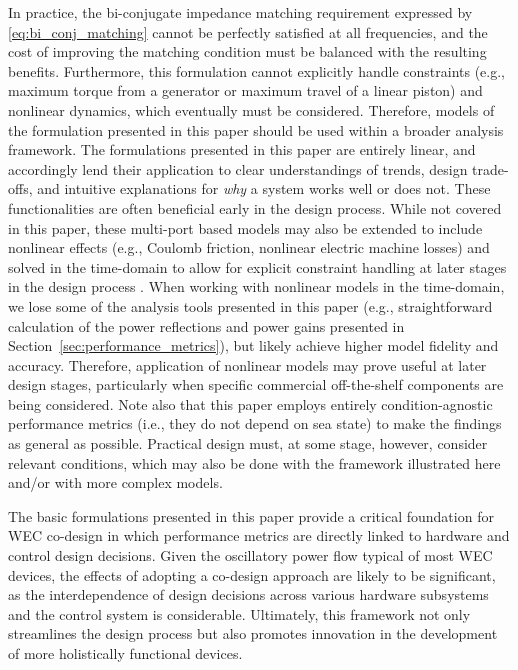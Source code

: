 \documentclass[5p,times]{elsarticle}
\begin{document}
In practice, the bi-conjugate impedance matching requirement expressed by \eqref{eq:bi_conj_matching} cannot be perfectly satisfied at all frequencies, and the cost of improving the matching condition must be balanced with the resulting benefits.
Furthermore, this formulation cannot explicitly handle constraints (e.g., maximum torque from a generator or maximum travel of a linear piston) and nonlinear dynamics, which eventually must be considered.
Therefore, models of the formulation presented in this paper should be used within a broader analysis framework.
The formulations presented in this paper are entirely linear, and accordingly lend their application to clear understandings of trends, design trade-offs, and intuitive explanations for \emph{why} a system works well or does not.
These functionalities are often beneficial early in the design process.
While not covered in this paper, these multi-port based models may also be extended to include nonlinear effects (e.g., Coulomb friction, nonlinear electric machine losses) and solved in the time-domain to allow for explicit constraint handling at later stages in the design process \cite{Gaebele:2023wf}.
When working with nonlinear models in the time-domain, we lose some of the analysis tools presented in this paper (e.g., straightforward calculation of the power reflections and power gains presented in Section~\ref{sec:performance_metrics}), but likely achieve higher model fidelity and accuracy.
Therefore, application of nonlinear models may prove useful at later design stages, particularly when specific commercial off-the-shelf components are being considered.
Note also that this paper employs entirely condition-agnostic performance metrics (i.e., they do not depend on sea state) to make the findings as general as possible.
Practical design must, at some stage, however, consider relevant conditions, which may also be done with the framework illustrated here and/or with more complex models.

The basic formulations presented in this paper provide a critical foundation for WEC co-design in which performance metrics are directly linked to hardware and control design decisions.
Given the oscillatory power flow typical of most WEC devices, the effects of adopting a co-design approach are likely to be significant, as the interdependence of design decisions across various hardware subsystems and the control system is considerable.
Ultimately, this framework not only streamlines the design process but also promotes innovation in the development of more holistically functional devices.
\end{document}
